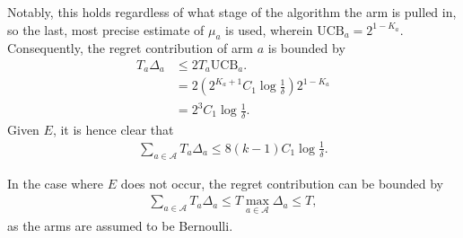 Notably, this holds regardless of what stage of the algorithm the arm is pulled in, so the last, most precise estimate of $\mu_a$ is used, wherein $\text{UCB}_a = 2^{1 - K_a}$.
Consequently, the regret contribution of arm $a$ is bounded by
\begin{equation}
    \begin{aligned}
        T_a \Delta_a & \leq 2 T_a \text{UCB}_a.                            \\
                     & = 2 (2^{K_a + 1} C_1 \log \frac1\delta) 2^{1 - K_a} \\
                     & = 2^3 C_1 \log \frac1\delta.
    \end{aligned}
\end{equation}
Given $E$, it is hence clear that
\begin{equation}
    \begin{aligned}
        \sum_{a \in \mathcal{A}} T_a \Delta_a  \leq 8 (k-1) C_1 \log \frac1\delta.
    \end{aligned}
\end{equation}

In the case where $E$ does not occur, the regret contribution can be bounded by
\begin{equation}
    \begin{aligned}
        \sum_{a \in \mathcal{A}} T_a \Delta_a \leq T \max_{a\in \mathcal{A}} \Delta_a \leq T,
    \end{aligned}
\end{equation}
as the arms are assumed to be Bernoulli.

